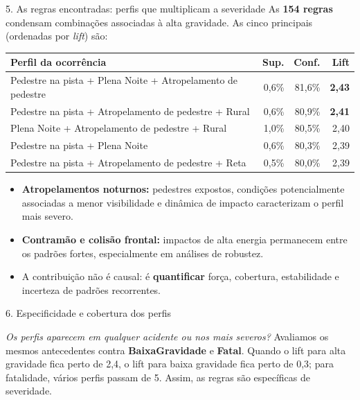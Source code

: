 \documentclass[final]{beamer}
\newlength{\colwidth}
\newcommand{\hl}[1]{{\color{ufmgred}\textbf{#1}}}
\begin{document}
\begin{frame}[t]
\begin{columns}[t,onlytextwidth]
\begin{column}{\colwidth}
\begin{block}{5. As regras encontradas: perfis que multiplicam a severidade}
    As \textbf{154 regras} condensam combinações associadas à alta gravidade. As cinco
    principais (ordenadas por \emph{lift}) são:

    \vspace{0.9ex}
    \begin{center}
      \renewcommand{\arraystretch}{1.5}
      \small
      \setlength{\tabcolsep}{10pt}
      \begin{tabular}{@{}>{\raggedright\arraybackslash}p{12.8cm}rrr@{}}
        \toprule
        \textbf{Perfil da ocorrência} & \textbf{Sup.} & \textbf{Conf.} & \textbf{Lift} \\
        \midrule
        Pedestre na pista + Plena Noite + Atropelamento de pedestre & 0,6\% & 81,6\% & \hl{2,43} \\
        Pedestre na pista + Atropelamento de pedestre + Rural & 0,6\% & 80,9\% & \hl{2,41} \\
        Plena Noite + Atropelamento de pedestre + Rural & 1,0\% & 80,5\% & 2,40 \\
        Pedestre na pista + Plena Noite & 0,6\% & 80,3\% & 2,39 \\
        Pedestre na pista + Atropelamento de pedestre + Reta & 0,5\% & 80,0\% & 2,39 \\
        \bottomrule
      \end{tabular}
    \end{center}

    \begin{itemize}
      \item \textbf{Atropelamentos noturnos:} pedestres expostos, condições potencialmente
        associadas a menor visibilidade e dinâmica de impacto caracterizam o perfil mais
        severo.
      \item \textbf{Contramão e colisão frontal:} impactos de alta energia permanecem entre
        os padrões fortes, especialmente em análises de robustez.
      \item A contribuição não é causal: é \textbf{quantificar} força, cobertura,
        estabilidade e incerteza de padrões recorrentes.
    \end{itemize}

  \end{block}

  \begin{block}{6. Especificidade e cobertura dos perfis}

    \textit{Os perfis aparecem em qualquer acidente ou nos mais severos?} Avaliamos os
    mesmos antecedentes contra \textbf{BaixaGravidade} e \textbf{Fatal}. Quando o lift para
    alta gravidade fica perto de 2,4, o lift para baixa gravidade fica perto de 0,3; para
    fatalidade, vários perfis passam de 5. Assim, as regras são específicas de severidade.


\end{block}
\end{column}
\end{columns}
\end{frame}
\end{document}

